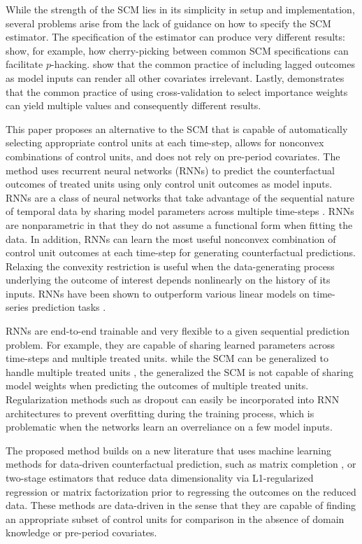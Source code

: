 While the strength of the SCM lies in its simplicity in setup and implementation, several problems arise from the lack of guidance on how to specify the SCM estimator. The specification of the estimator can produce very different results: \citet{ferman2018cherry} show, for example, how cherry-picking between common SCM specifications can facilitate $p$-hacking. \citet{kaul2015synthetic} show that the common practice of including lagged outcomes as model inputs can render all other covariates irrelevant. Lastly, \citet{klossner2017comparative} demonstrates that the common practice of using cross-validation to select importance weights can yield multiple values and consequently different results. 

This paper proposes an alternative to the SCM that is capable of automatically selecting appropriate control units at each time-step, allows for nonconvex combinations of control units, and does not rely on pre-period covariates. The method uses recurrent neural networks (RNNs) to predict the counterfactual outcomes of treated units using only control unit outcomes as model inputs. RNNs are a class of neural networks that take advantage of the sequential nature of temporal data by sharing model parameters across multiple time-steps \citep{el1995}. RNNs are nonparametric in that they do not assume a functional form when fitting the data. In addition, RNNs can learn the most useful nonconvex combination of control unit outcomes at each time-step for generating counterfactual predictions. Relaxing the convexity restriction is useful when the data-generating process underlying the outcome of interest depends nonlinearly on the history of its inputs. RNNs have been shown to outperform various linear models on time-series prediction tasks \citep{cinar2017position}. 

RNNs are end-to-end trainable and very flexible to a given sequential prediction problem. For example, they are capable of sharing learned parameters across time-steps and multiple treated units. while the SCM can be generalized to handle multiple treated units \citep[e.g.,][]{dube2015pooling,xu2017generalized}, the generalized the SCM is not capable of sharing model weights when predicting the outcomes of multiple treated units. Regularization methods such as dropout can easily be incorporated into RNN architectures to prevent overfitting during the training process, which is problematic when the networks learn an overreliance on a few model inputs.

The proposed method builds on a new literature that uses machine learning methods for data-driven counterfactual prediction, such as matrix completion \citep{athey2017matrix}, or two-stage estimators that reduce data dimensionality via L1-regularized regression \citep{doudchenko2016balancing,carvalho2018arco} or matrix factorization \citep{amjad2018robust} prior to regressing the outcomes on the reduced data. These methods are data-driven in the sense that they are capable of finding an appropriate subset of control units for comparison in the absence of domain knowledge or pre-period covariates. 

